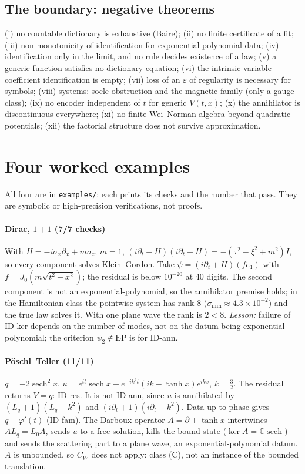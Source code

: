\documentclass[11pt]{article}
\theoremstyle{plain}
\theoremstyle{definition}
\theoremstyle{remark}
\begin{document}
\subsection*{The boundary: negative theorems}
(i) no countable dictionary is exhaustive (Baire); (ii) no finite certificate of a fit; (iii) non-monotonicity of identification for exponential-polynomial data; (iv) identification only in the limit, and no rule decides existence of a law; (v) a generic function satisfies no dictionary equation; (vi) the intrinsic variable-coefficient identification is empty;
(vii) loss of an $\varepsilon$ of regularity is necessary for symbols; (viii) systems: socle obstruction and the magnetic family (only a gauge class); (ix) no encoder independent of $t$ for generic $V(t,x)$; (x) the annihilator is discontinuous everywhere; (xi) no finite Wei--Norman algebra beyond quadratic potentials; (xii) the factorial structure does not survive approximation.



\section{Four worked examples}\label{sec:examples}
All four are in \texttt{examples/}; each prints its checks and the number that pass. They are symbolic or high-precision verifications, not proofs.

\paragraph{Dirac, $1{+}1$ (7/7 checks)} With $H=-i\sigma_x\partial_x+m\sigma_z$, $m=1$, $(i\partial_t-H)(i\partial_t+H)=-(\tau^2-\xi^2+m^2)I$, so every component solves Klein--Gordon. Take $\psi=(i\partial_t+H)(fe_1)$ with $f=J_0(m\sqrt{t^2-x^2})$; the residual is below $10^{-20}$ at 40 digits.
The second component is not an exponential-polynomial, so the annihilator premise holds; in the Hamiltonian class the pointwise system has rank $8$ ($\sigma_{\min}\approx4.3\times10^{-2}$) and the true law solves it. With one plane wave the rank is $2<8$.
\emph{Lesson:} failure of ID-ker depends on the number of modes, not on the datum being exponential-polynomial; the criterion $\psi_2\notin\mathrm{EP}$ is for ID-ann.

\paragraph{P\"oschl--Teller (11/11)} $q=-2\operatorname{sech}^2x$, $u=e^{it}\operatorname{sech}x+e^{-ik^2t}(ik-\tanh x)e^{ikx}$, $k=\tfrac32$. The residual returns $V=q$: ID-res. It is not ID-ann, since $u$ is annihilated by $(L_q+1)(L_q-k^2)$ and $(i\partial_t+1)(i\partial_t-k^2)$.
Data up to phase gives $q-\varphi'(t)$ (ID-fam). The Darboux operator $A=\partial+\tanh x$ intertwines $A L_q=L_0A$, sends $u$ to a free solution, kills the bound state ($\ker A=\mathbb C\operatorname{sech}$) and sends the scattering part to a plane wave, an exponential-polynomial datum. $A$ is unbounded, so $C_W$ does not apply: class (C), not an instance of the bounded translation.
\end{document}
